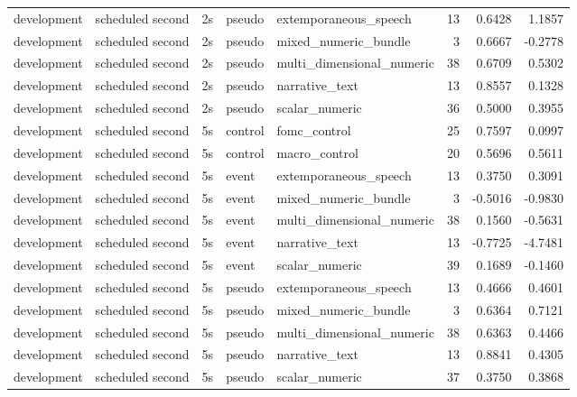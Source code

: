 \begin{tabular}{lllllrrr}
development & scheduled second & 2s & pseudo & extemporaneous_speech & 13 & 0.6428 & 1.1857 \\
development & scheduled second & 2s & pseudo & mixed_numeric_bundle & 3 & 0.6667 & -0.2778 \\
development & scheduled second & 2s & pseudo & multi_dimensional_numeric & 38 & 0.6709 & 0.5302 \\
development & scheduled second & 2s & pseudo & narrative_text & 13 & 0.8557 & 0.1328 \\
development & scheduled second & 2s & pseudo & scalar_numeric & 36 & 0.5000 & 0.3955 \\
development & scheduled second & 5s & control & fomc_control & 25 & 0.7597 & 0.0997 \\
development & scheduled second & 5s & control & macro_control & 20 & 0.5696 & 0.5611 \\
development & scheduled second & 5s & event & extemporaneous_speech & 13 & 0.3750 & 0.3091 \\
development & scheduled second & 5s & event & mixed_numeric_bundle & 3 & -0.5016 & -0.9830 \\
development & scheduled second & 5s & event & multi_dimensional_numeric & 38 & 0.1560 & -0.5631 \\
development & scheduled second & 5s & event & narrative_text & 13 & -0.7725 & -4.7481 \\
development & scheduled second & 5s & event & scalar_numeric & 39 & 0.1689 & -0.1460 \\
development & scheduled second & 5s & pseudo & extemporaneous_speech & 13 & 0.4666 & 0.4601 \\
development & scheduled second & 5s & pseudo & mixed_numeric_bundle & 3 & 0.6364 & 0.7121 \\
development & scheduled second & 5s & pseudo & multi_dimensional_numeric & 38 & 0.6363 & 0.4466 \\
development & scheduled second & 5s & pseudo & narrative_text & 13 & 0.8841 & 0.4305 \\
development & scheduled second & 5s & pseudo & scalar_numeric & 37 & 0.3750 & 0.3868 \\
\bottomrule
\end{tabular}
